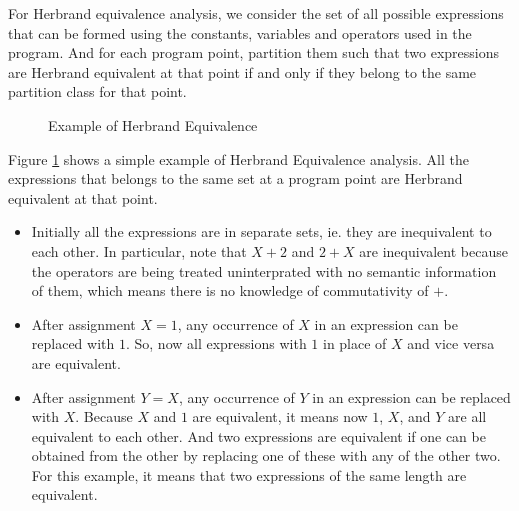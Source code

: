 For Herbrand equivalence analysis, we consider the set of all 
possible expressions that can be formed using the constants, 
variables and operators used in the program. And for each program 
point, partition them such that two expressions are Herbrand 
equivalent at that point if and only if they belong to the same 
partition class for that point.

\begin{figure}[!ht]
    \caption{Example of Herbrand Equivalence}
    \label{fig:herbrandExampleTrans}
\end{figure}

Figure \ref{fig:herbrandExampleTrans} shows a simple example of Herbrand Equivalence analysis. All the expressions that belongs to the same set at a program point are Herbrand equivalent at that point.
\begin{itemize}
    \item   Initially all the expressions are in separate sets, ie. 
    they are inequivalent to each other. In particular, note that 
    $X + 2$ and $2 + X$ are inequivalent because the operators are 
    being treated uninterprated with no semantic information of them, 
    which means there is no knowledge of commutativity of $+$.
    \item   After assignment $X = 1$, any occurrence of $X$ in an
    expression can be replaced with $1$. So, now all expressions with 
    $1$ in place of $X$ and vice versa are equivalent.
    \item   After assignment $Y = X$, any occurrence of $Y$ in 
    an expression can be replaced with $X$. Because $X$ and $1$ are 
    equivalent, it means now $1$, $X$, and $Y$ are all equivalent to 
    each other. And two expressions are equivalent if one can be 
    obtained from the other by replacing one of these with any of the 
    other two. For this example, it means that two expressions of 
    the same length are equivalent.
\end{itemize}

